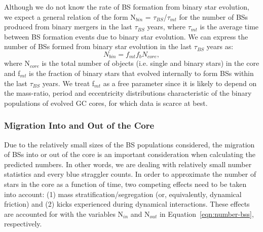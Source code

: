 Although we do not know the rate of BS formation from binary star
evolution, we expect a general relation of the form
N$_{bin}$ = $\tau_{BS}$/$\tau_{mt}$ for the number of BSs produced
from binary mergers in the last $\tau_{BS}$ years, where $\tau_{mt}$
is the average time between BS formation events due to binary star
evolution.  We can express the number of BSs formed from binary star
evolution in the last $\tau_{BS}$ years as:
\begin{equation}
\label{eqn:N-bin}
N_{bin} = f_{mt}f_bN_{core},
\end{equation}
where  N$_{core}$ is the total number of
objects (i.e. single and binary stars) in the core and f$_{mt}$ is
the fraction of binary stars that evolved internally to form
BSs within the last $\tau_{BS}$ years.  We treat f$_{mt}$ as a free
parameter since it is likely to depend on the mass-ratio, period and
eccentricity distributions characteristic of the binary populations of
evolved GC cores, for which data is scarce at best.  

\subsubsection{Migration Into and Out of the Core}
\label{segregation5}

Due to the relatively small sizes of the BS populations
considered, the migration of BSs into or out of the core is an
important consideration when calculating the predicted numbers.  In
other words, we are dealing with relatively small
number statistics and every blue straggler counts.  In order to
approximate the number of stars in the core as a function of time,
two competing effects need to be taken into account:  (1) mass
stratification/segregation (or, equivalently, dynamical friction) and
(2) kicks experienced during dynamical interactions.  
These effects are accounted for with the variables N$_{in}$ and
N$_{out}$ in Equation~\ref{eqn:number-bss}, respectively.  

